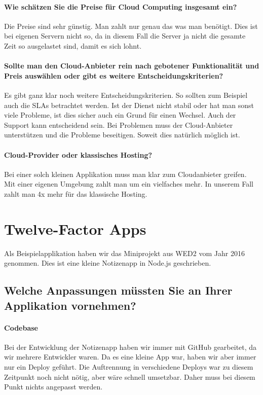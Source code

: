\subsubsection{Wie schätzen Sie die Preise für Cloud Computing insgesamt ein?}
Die Preise sind sehr günstig. Man zahlt nur genau das was man benötigt. Dies ist bei eigenen Servern nicht so, da in diesem Fall die Server ja nicht die gesamte Zeit so ausgelastet sind, damit es sich lohnt.
\subsubsection{Sollte man den Cloud-Anbieter rein nach gebotener Funktionalität und Preis auswählen oder gibt es weitere Entscheidungskriterien?}
Es gibt ganz klar noch weitere Entscheidungskriterien. So sollten zum Beispiel auch die SLAs betrachtet werden. Ist der Dienst nicht stabil oder hat man sonst viele Probleme, ist dies sicher auch ein Grund für einen Wechsel.
Auch der Support kann entscheidend sein. Bei Problemen muss der Cloud-Anbieter unterstützen und die Probleme beseitigen. Soweit dies natürlich möglich ist.
\subsubsection{Cloud-Provider oder klassisches Hosting?}
Bei einer solch kleinen Applikation muss man klar zum Cloudanbieter greifen. Mit einer eigenen Umgebung zahlt man um ein vielfaches mehr. In unserem Fall zahlt man 4x mehr für das klassische Hosting. 
\chapter{Twelve-Factor Apps}
Als Beispielapplikation haben wir das Miniprojekt aus WED2 vom Jahr 2016 genommen. Dies ist eine kleine Notizenapp in Node.js geschrieben.
\section{Welche Anpassungen müssten Sie an Ihrer Applikation vornehmen?}
\subsubsection{Codebase}
Bei der Entwicklung der Notizenapp haben wir immer mit GitHub gearbeitet, da wir mehrere Entwickler waren. Da es eine kleine App war, haben wir aber immer nur ein Deploy geführt. Die Auftrennung in verschiedene Deploys war zu diesem Zeitpunkt noch nicht nötig, aber wäre schnell umsetzbar. Daher muss bei diesem Punkt nichts angepasst werden. 
